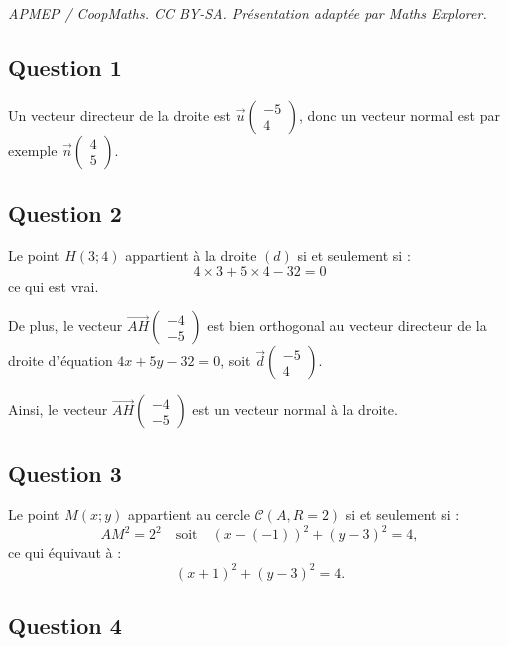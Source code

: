 \documentclass[10pt]{article}
\begin{document}
\noindent\textit{APMEP / CoopMaths. CC BY-SA. Présentation adaptée par Maths Explorer.}\par\medskip
\subsection*{Question 1}
	
	Un vecteur directeur de la droite est 
	$\vec u\begin{pmatrix} -5 \\ 4 \end{pmatrix}$, donc un vecteur normal est par exemple $\vec{n}  \begin{pmatrix} 4 \\ 5 \end{pmatrix}$.
	
	\subsection*{Question 2}
	
	Le point $H(3 ; 4)$ appartient à la droite $(d)$ si et seulement si :
	\[
	4 \times 3 + 5 \times 4 - 32 = 0
	\]
	ce qui est vrai.
	
	De plus, le vecteur $\overrightarrow{AH} \begin{pmatrix} -4 \\ -5 \end{pmatrix}$ est bien orthogonal au vecteur directeur de la droite d'équation $4x + 5y - 32 = 0$, soit $\vec d \begin{pmatrix} -5 \\ 4 \end{pmatrix}$.
	
	Ainsi, le vecteur $\overrightarrow{AH} \begin{pmatrix} -4 \\ -5 \end{pmatrix}$ est un vecteur normal à la droite.
	
	\subsection*{Question 3}
	
	Le point $M(x ; y)$ appartient au cercle $\mathcal{C}(A, R = 2)$ si et seulement si :
	\[
	AM^2 = 2^2 \quad \text{soit} \quad (x - (-1))^2 + (y - 3)^2 = 4,
	\]
	ce qui équivaut à :
	\[
	(x + 1)^2 + (y - 3)^2 = 4.
	\]
	
	\subsection*{Question 4}
	
\end{document}
